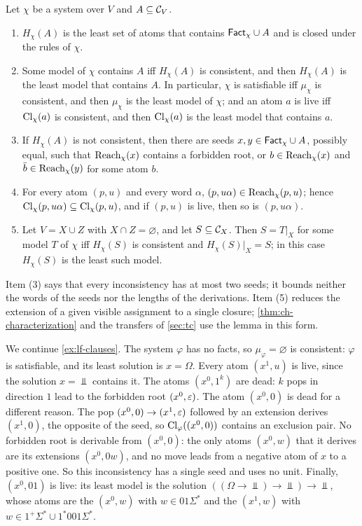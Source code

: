 \begin{lemma}\label{lem:lf-closure}
Let $\chi$ be a system over $V$ and $A\subseteq\mathcal C_V$.
\begin{enumerate}[leftmargin=*]
\item $H_\chi(A)$ is the least set of atoms that contains $\mathsf{Fact}_\chi\cup A$
  and is closed under the rules of $\chi$.
\item Some model of $\chi$ contains $A$ iff $H_\chi(A)$ is consistent, and
  then $H_\chi(A)$ is the least model that contains $A$. In particular,
  $\chi$ is satisfiable iff $\mu_\chi$ is consistent, and then $\mu_\chi$ is
  the least model of $\chi$; and an atom $a$ is live iff $\operatorname{Cl}_\chi(a)$ is
  consistent, and then $\operatorname{Cl}_\chi(a)$ is the least model that contains $a$.
\item If $H_\chi(A)$ is not consistent, then there are seeds
  $x,y\in\mathsf{Fact}_\chi\cup A$, possibly equal, such that $\operatorname{Reach}_\chi(x)$ contains a
  forbidden root, or $b\in \operatorname{Reach}_\chi(x)$ and $\bar b\in \operatorname{Reach}_\chi(y)$ for some atom
  $b$.
\item For every atom $(p,u)$ and every word $\alpha$,
  $(p,u\alpha)\in \operatorname{Reach}_\chi(p,u)$; hence
  $\operatorname{Cl}_\chi(p,u\alpha)\subseteq\operatorname{Cl}_\chi(p,u)$, and if $(p,u)$ is live, then
  so is $(p,u\alpha)$.
\item Let $V=X\cup Z$ with $X\cap Z=\varnothing$, and let $S\subseteq\mathcal C_X$.
  Then $S=T|_X$ for some model $T$ of $\chi$ iff $H_\chi(S)$ is consistent and
  $H_\chi(S)|_X=S$; in this case $H_\chi(S)$ is the least such model.
\end{enumerate}
\end{lemma}

Item (3) says that every inconsistency has at most two seeds; it bounds
neither the words of the seeds nor the lengths of the derivations. Item (5)
reduces the extension of a given visible assignment to a single closure;
\cref{thm:ch-characterization} and the transfers of \cref{sec:tc} use the
lemma in this form.

\begin{example}[Liveness in $x\le x\to x$]\label{ex:lf-least}
We continue \cref{ex:lf-clauses}. The system $\varphi$ has no facts,
so $\mu_\varphi=\varnothing$ is consistent: $\varphi$ is satisfiable, and its
least solution is $x=\Omega$. Every atom $(x^1,u)$ is live, since the
solution $x=\Bot$ contains it. The atoms $(x^0,1^k)$ are dead: $k$ pops in
direction $1$ lead to the forbidden root $(x^0,\varepsilon)$. The atom $(x^0,0)$ is
dead for a different reason. The pop $(x^0,0)\to(x^1,\varepsilon)$ followed by an
extension derives $(x^1,0)$, the opposite of the seed, so
$\operatorname{Cl}_\varphi((x^0,0))$ contains an exclusion pair. No forbidden root is
derivable from $(x^0,0)$: the only atoms $(x^0,w)$ that it derives are its
extensions $(x^0,0w)$, and no move leads from a negative atom of $x$ to a
positive one. So this inconsistency has a single seed and uses no unit.
Finally, $(x^0,01)$ is live: its least model is the solution
$((\Omega\to\Bot)\to\Bot)\to\Bot$, whose atoms are the $(x^0,w)$ with
$w\in01\Sigma^*$ and the $(x^1,w)$ with $w\in1^+\Sigma^*\cup1^*001\Sigma^*$.
\end{example}

